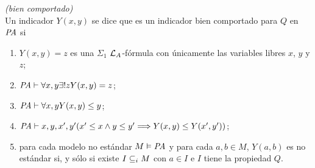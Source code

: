 \begin{defn} \textit{(bien comportado)}\\
    Un indicador $Y(x,y)$ se dice que es un indicador bien comportado para $Q$ en $\textit{PA}$ si 
    \begin{enumerate}
        \item $Y(x,y)=z$ es una $\Sigma_1$ $\mathcal{L}_A$-fórmula con únicamente las variables libres $x$, $y$ y $z$;
        \item $\textit{PA}\vdash\forall x,y\exists!z Y(x,y)=z$;
        \item $\textit{PA}\vdash\forall x,y Y(x,y)\leq y$;
        \item $\textit{PA}\vdash x,y,x',y'(x'\leq x\land y\leq y'\Longrightarrow Y(x,y)\leq Y(x',y'))$;
        \item para cada modelo no estándar $M\vDash\textit{PA}$ y para cada $a,b\in M$, $Y(a,b)$ es no estándar si, y sólo si existe $I\subseteq_i M$ con $a\in I$ e $I$ tiene la propiedad $Q$.
    \end{enumerate}
\end{defn}


